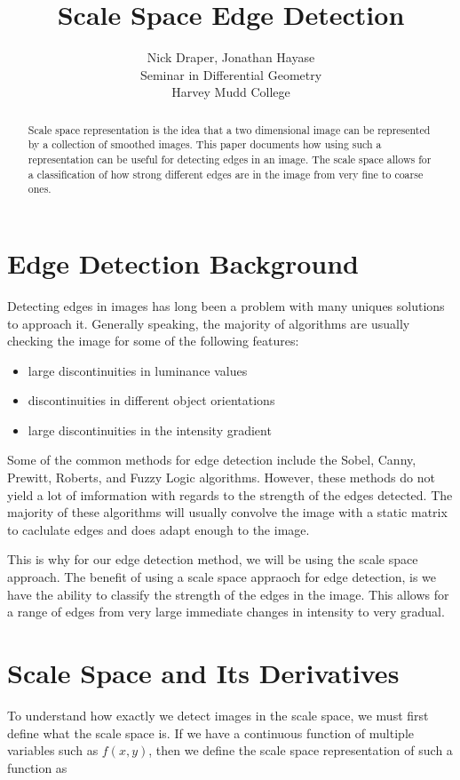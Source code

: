 \documentclass{article}
\title{Scale Space Edge Detection}
\author{
  Nick Draper, Jonathan Hayase\\
  Seminar in Differential Geometry\\
  Harvey Mudd College
}
\begin{document}
\maketitle

\begin{abstract}
    Scale space representation is the idea that a two dimensional image can be represented by a collection of smoothed images. This paper documents how using such a representation can be useful for detecting edges in an image. The scale space allows for a classification of how strong different edges are in the image from very fine to coarse ones. 
\end{abstract}

\section{Edge Detection Background}
    Detecting edges in images has long been a problem with many uniques solutions to approach it. Generally speaking, the majority of algorithms are usually checking the image for some of the following features:

    \begin{itemize}
        \item large discontinuities in luminance values
        \item discontinuities in different object orientations
        \item large discontinuities in the intensity gradient
    \end{itemize}

    \indent Some of the common methods for edge detection include the Sobel, Canny, Prewitt, Roberts, and Fuzzy Logic algorithms. However, these methods do not yield a lot of imformation with regards to the strength of the edges detected. The majority of these algorithms will usually convolve the image with a static matrix to caclulate edges and does adapt enough to the image. 

    This is why for our edge detection method, we will be using the scale space approach. The benefit of using a scale space appraoch for edge detection, is we have the ability to classify the strength of the edges in the image. This allows for a range of edges from very large immediate changes in intensity to very gradual. 

\section{Scale Space and Its Derivatives}
    To understand how exactly we detect images in the scale space, we must first define what the scale space is. If we have a continuous function of multiple variables such as $f(x,y)$, then we define the scale space representation of such a function as 
\end{document}
